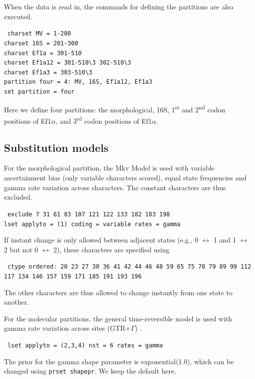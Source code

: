\documentclass[12pt]{article}
\begin{document}
When the data is read in, the commands for defining the partitions are also executed.
\begin{framed}
{\tt \noindent
charset MV = 1-200      \\
charset 16S = 201-300   \\
charset Ef1a = 301-510  \\
charset Ef1a12 = 301-510\textbackslash 3 302-510\textbackslash 3 \\
charset Ef1a3 = 303-510\textbackslash 3         \\
partition four = 4: MV, 16S, Ef1a12, Ef1a3      \\
set partition = four}
\end{framed}
\noindent Here we define four partitions:
the morphological, 16S, 1\textsuperscript{st} and 2\textsuperscript{nd} codon positions of Ef1$\alpha$, and 3\textsuperscript{rd} codon positions of Ef1$\alpha$.

\subsection{Substitution models}

For the morphological partition, the Mkv Model \citep{Lewis:2001wu} is used with variable ascertainment bias (only variable characters scored), equal state frequencies and gamma rate variation across characters.
The constant characters are thus excluded.
\begin{framed}
{\tt \noindent
exclude 7 31 61 83 107 121 122 133 182 183 198 \\
lset applyto = (1) coding = variable rates = gamma}
\end{framed}
\noindent If instant change is only allowed between adjacent states (e.g., 0 $\leftrightarrow$ 1 and 1 $\leftrightarrow$ 2 but not 0 $\leftrightarrow$ 2), these characters are specified using 
\begin{framed}
{\tt \noindent
ctype ordered: 20 23 27 30 36 41 42 44 46 48 59 65 75 78 79 89 99 112 117 134 146 157 159 171 185 191 193 196}
\end{framed}
\noindent The other characters are thus allowed to change instantly from one state to another.

For the molecular partitions, the general time-reversible model is used with gamma rate variation across sites (GTR$+\Gamma$) \citep{Yang:1994vo, Yang:1994wd}.
\begin{framed}
{\tt \noindent
lset applyto = (2,3,4) nst = 6 rates = gamma}
\end{framed}
\noindent The prior for the gamma shape parameter is exponential(1.0), which can be changed using {\tt prset shapepr}. We keep the default here.
\end{document}
